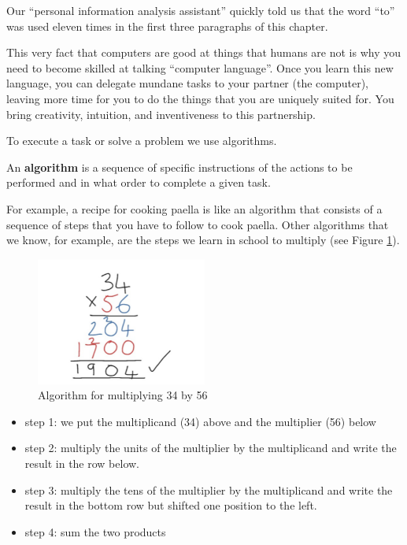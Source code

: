 Our ``personal information analysis assistant'' quickly told us that the word ``to'' was used eleven times in the first three paragraphs of this chapter.

This very fact that computers are good at things that humans are not is why you need to become skilled at talking ``computer language''. Once you learn this new language, you can delegate mundane tasks to your partner (the computer), leaving more time for you to do the things that you are uniquely suited for. You bring creativity, intuition, and inventiveness to this partnership.

To execute a task or solve a problem we use algorithms. 
\begin{definition}
An \textbf{algorithm} is a sequence of specific instructions of the actions to be performed and in what order to complete a given task.
\end{definition}

For example, a recipe for cooking paella is like an algorithm that consists of a sequence of steps that you have to follow to cook paella.
%
Other algorithms that we know, for example, are the steps we learn in school to multiply (see Figure \ref{fig:multiplicar}). 

\begin{figure}
    \centering
    \includegraphics[width=0.5\textwidth]{images/multiplicar}
    \caption{Algorithm for multiplying 34 by 56}
    \label{fig:multiplicar}
\end{figure}


\begin{itemize}[nosep]
\item
  step 1: we put the multiplicand (34) above and the multiplier (56) below
\item
  step 2: multiply the units of the multiplier by the multiplicand and write the result in the row below.
\item
  step 3: multiply the tens of the multiplier by the multiplicand and write the result in the bottom row but shifted one position to the left.
\item
  step 4: sum the two products
\end{itemize}

